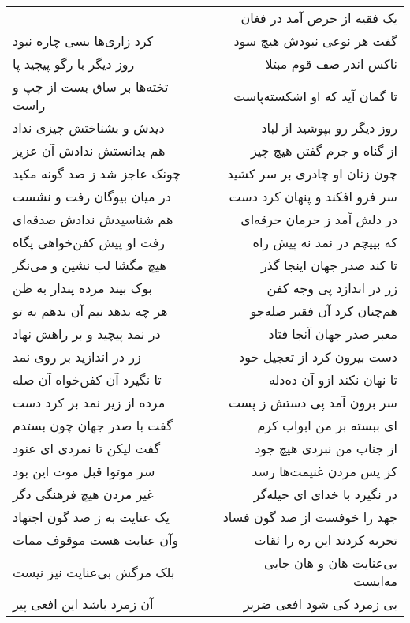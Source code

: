 \begin{center}
\begin{longtable}{l p{0.5cm} r}
&&
یک فقیه از حرص آمد در فغان
\\
کرد زاری‌ها بسی چاره نبود
&&
گفت هر نوعی نبودش هیچ سود
\\
روز دیگر با رگو پیچید پا
&&
ناکس اندر صف قوم مبتلا
\\
تخته‌ها بر ساق بست از چپ و راست
&&
تا گمان آید که او اشکسته‌پاست
\\
دیدش و بشناختش چیزی نداد
&&
روز دیگر رو بپوشید از لباد
\\
هم بدانستش ندادش آن عزیز
&&
از گناه و جرم گفتن هیچ چیز
\\
چونک عاجز شد ز صد گونه مکید
&&
چون زنان او چادری بر سر کشید
\\
در میان بیوگان رفت و نشست
&&
سر فرو افکند و پنهان کرد دست
\\
هم شناسیدش ندادش صدقه‌ای
&&
در دلش آمد ز حرمان حرقه‌ای
\\
رفت او پیش کفن‌خواهی پگاه
&&
که بپیچم در نمد نه پیش راه
\\
هیچ مگشا لب نشین و می‌نگر
&&
تا کند صدر جهان اینجا گذر
\\
بوک بیند مرده پندار به ظن
&&
زر در اندازد پی وجه کفن
\\
هر چه بدهد نیم آن بدهم به تو
&&
هم‌چنان کرد آن فقیر صله‌جو
\\
در نمد پیچید و بر راهش نهاد
&&
معبر صدر جهان آنجا فتاد
\\
زر در اندازید بر روی نمد
&&
دست بیرون کرد از تعجیل خود
\\
تا نگیرد آن کفن‌خواه آن صله
&&
تا نهان نکند ازو آن ده‌دله
\\
مرده از زیر نمد بر کرد دست
&&
سر برون آمد پی دستش ز پست
\\
گفت با صدر جهان چون بستدم
&&
ای ببسته بر من ابواب کرم
\\
گفت لیکن تا نمردی ای عنود
&&
از جناب من نبردی هیچ جود
\\
سر موتوا قبل موت این بود
&&
کز پس مردن غنیمت‌ها رسد
\\
غیر مردن هیچ فرهنگی دگر
&&
در نگیرد با خدای ای حیله‌گر
\\
یک عنایت به ز صد گون اجتهاد
&&
جهد را خوفست از صد گون فساد
\\
وآن عنایت هست موقوف ممات
&&
تجربه کردند این ره را ثقات
\\
بلک مرگش بی‌عنایت نیز نیست
&&
بی‌عنایت هان و هان جایی مه‌ایست
\\
آن زمرد باشد این افعی پیر
&&
بی زمرد کی شود افعی ضریر
\\
\end{longtable}
\end{center}
